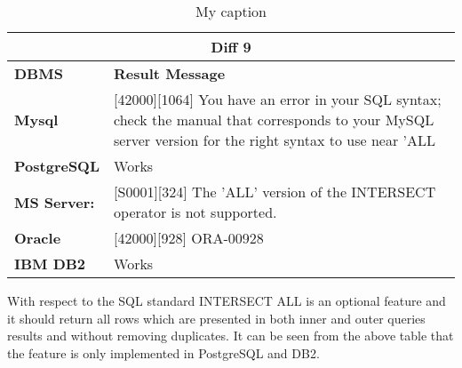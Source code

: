  
\begin{table}[h]
\centering
\caption{My caption}
\label{my-label}
\begin{tabular}{|l|l|}
\hline
\multicolumn{2}{|c|}{\textbf{Diff 9}}                                                                                                                                                                                                \\ \hline
\textbf{DBMS}                              & \textbf{Result Message}                                                                                                                                                                 \\ \hline
{\color[HTML]{333333} \textbf{Mysql}}      & {\color[HTML]{333333} {[}42000{]}{[}1064{]} You have an error in your SQL syntax; check the manual that corresponds to your MySQL server version for the right syntax to use near 'ALL} \\ \hline
{\color[HTML]{333333} \textbf{PostgreSQL}} & {\color[HTML]{333333} Works}                                                                                                                                                            \\ \hline
{\color[HTML]{333333} \textbf{MS Server:}} & {\color[HTML]{333333} {[}S0001{]}{[}324{]} The 'ALL' version of the INTERSECT operator is not supported.}                                                                               \\ \hline
\textbf{Oracle}                            & {[}42000{]}{[}928{]} ORA-00928                                                                                                                                                          \\ \hline
\textbf{IBM DB2}                           & Works                                                                                                                                                                                   \\ \hline
\end{tabular}
\end{table}

With respect to the SQL standard INTERSECT ALL is an optional feature and it should return all rows which are presented in both inner and outer queries results and without removing duplicates. It can be seen from the above table that the feature is only implemented in PostgreSQL and DB2.  



